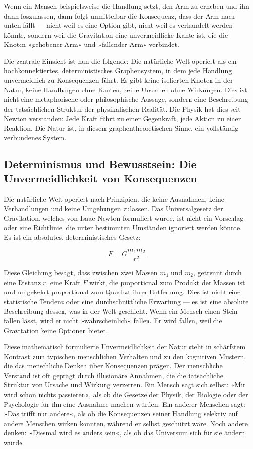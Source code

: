 \documentclass[12pt,a4paper]{article}
\begin{document}
Wenn ein Mensch beispielsweise die Handlung setzt, den Arm zu erheben und ihn dann loszulassen, dann folgt unmittelbar die Konsequenz, dass der Arm nach unten fällt — nicht weil es eine Option gibt, nicht weil es verhandelt werden könnte, sondern weil die Gravitation eine unvermeidliche Kante ist, die die Knoten »gehobener Arm« und »fallender Arm« verbindet.

Die zentrale Einsicht ist nun die folgende: Die natürliche Welt operiert als ein hochkonnektiertes, deterministisches Graphensystem, in dem jede Handlung unvermeidlich zu Konsequenzen führt. Es gibt keine isolierten Knoten in der Natur, keine Handlungen ohne Kanten, keine Ursachen ohne Wirkungen. Dies ist nicht eine metaphorische oder philosophische Aussage, sondern eine Beschreibung der tatsächlichen Struktur der physikalischen Realität. Die Physik hat dies seit Newton verstanden: Jede Kraft führt zu einer Gegenkraft, jede Aktion zu einer Reaktion. Die Natur ist, in diesem graphentheoretischen Sinne, ein vollständig verbundenes System.

\subsection{Determinismus und Bewusstsein: Die Unvermeidlichkeit von Konsequenzen}

Die natürliche Welt operiert nach Prinzipien, die keine Ausnahmen, keine Verhandlungen und keine Umgehungen zulassen. Das Universalgesetz der Gravitation, welches von Isaac Newton formuliert wurde, ist nicht ein Vorschlag oder eine Richtlinie, die unter bestimmten Umständen ignoriert werden könnte. Es ist ein absolutes, deterministisches Gesetz:

\begin{equation}
F = G \frac{m_1 m_2}{r^2}
\end{equation}

Diese Gleichung besagt, dass zwischen zwei Massen $m_1$ und $m_2$, getrennt durch eine Distanz $r$, eine Kraft $F$ wirkt, die proportional zum Produkt der Massen ist und umgekehrt proportional zum Quadrat ihrer Entfernung. Dies ist nicht eine statistische Tendenz oder eine durchschnittliche Erwartung — es ist eine absolute Beschreibung dessen, was in der Welt geschieht. Wenn ein Mensch einen Stein fallen lässt, wird er nicht »wahrscheinlich« fallen. Er wird fallen, weil die Gravitation keine Optionen bietet.

Diese mathematisch formulierte Unvermeidlichkeit der Natur steht in schärfstem Kontrast zum typischen menschlichen Verhalten und zu den kognitiven Mustern, die das menschliche Denken über Konsequenzen prägen. Der menschliche Verstand ist oft geprägt durch illusionäre Annahmen, die die tatsächliche Struktur von Ursache und Wirkung verzerren. Ein Mensch sagt sich selbst: »Mir wird schon nichts passieren«, als ob die Gesetze der Physik, der Biologie oder der Psychologie für ihn eine Ausnahme machen würden. Ein anderer Menschen sagt: »Das trifft nur andere«, als ob die Konsequenzen seiner Handlung selektiv auf andere Menschen wirken könnten, während er selbst geschützt wäre. Noch andere denken: »Diesmal wird es anders sein«, als ob das Universum sich für sie ändern würde.
\end{document}
